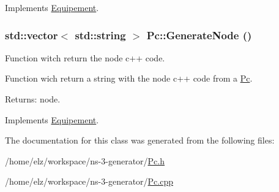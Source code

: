Implements \hyperlink{class_equipement_6d7c3d74a18a723f35f274fb5aa5f06b}{Equipement}.\hypertarget{class_pc_27e33b70f680c5fa0c947415c6d0a77f}{
\subsubsection[{GenerateNode}]{\setlength{\rightskip}{0pt plus 5cm}std::vector$<$ std::string $>$ Pc::GenerateNode ()}}
\label{class_pc_27e33b70f680c5fa0c947415c6d0a77f}


Function witch return the node c++ code. 

Function wich return a string with the node c++ code from a \hyperlink{class_pc}{Pc}.

\begin{Desc}
\item[Returns:]node. \end{Desc}


Implements \hyperlink{class_equipement_df32ce167d648ff92a6420dea4e6f06e}{Equipement}.

The documentation for this class was generated from the following files:\begin{CompactItemize}
\item 
/home/elz/workspace/ns-3-generator/\hyperlink{_pc_8h}{Pc.h}\item 
/home/elz/workspace/ns-3-generator/\hyperlink{_pc_8cpp}{Pc.cpp}\end{CompactItemize}
